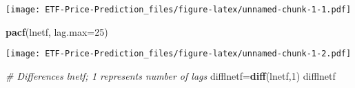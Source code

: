 \documentclass[
]{article}
\newenvironment{Shaded}{\begin{snugshade}}{\end{snugshade}}
\newcommand{\CommentTok}[1]{\textcolor[rgb]{0.56,0.35,0.01}{\textit{#1}}}
\newcommand{\DataTypeTok}[1]{\textcolor[rgb]{0.13,0.29,0.53}{#1}}
\newcommand{\DecValTok}[1]{\textcolor[rgb]{0.00,0.00,0.81}{#1}}
\newcommand{\KeywordTok}[1]{\textcolor[rgb]{0.13,0.29,0.53}{\textbf{#1}}}
\newcommand{\NormalTok}[1]{#1}
\begin{document}
\texttt{[image: ETF-Price-Prediction\_files/figure-latex/unnamed-chunk-1-1.pdf]}

\begin{Shaded}
\begin{Highlighting}[]
    \KeywordTok{pacf}\NormalTok{(lnetf, }\DataTypeTok{lag.max=}\DecValTok{25}\NormalTok{)}
\end{Highlighting}
\end{Shaded}

\texttt{[image: ETF-Price-Prediction\_files/figure-latex/unnamed-chunk-1-2.pdf]}

\begin{Shaded}
\begin{Highlighting}[]
  \CommentTok{# Differences lnetf; 1 represents number of lags}
\NormalTok{    difflnetf=}\KeywordTok{diff}\NormalTok{(lnetf,}\DecValTok{1}\NormalTok{)}
\NormalTok{    difflnetf}
\end{Highlighting}
\end{Shaded}
\end{document}

